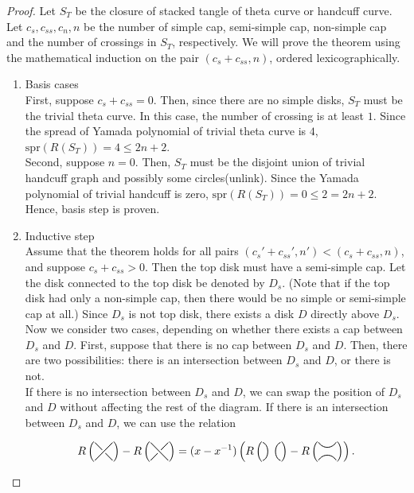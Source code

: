 \documentclass{article}
\newcommand{\czero}{
  \tikz[baseline=-0.6ex, scale=0.7]{
    \path (0,0) coordinate (base);
    \draw[line width=0.7pt] (0,0.4) .. controls (0.3,0.3) and (0.3,-0.3) .. (0,-0.4);
    \draw[line width=0.7pt] (0.8,0.4) .. controls (0.5,0.3) and (0.5,-0.3) .. (0.8,-0.4);
  }
}
\newcommand{\cinf}{
  \tikz[baseline=1.2ex, scale=0.7]{
    \path (0,0) coordinate (base);
    \draw[line width=0.7pt] (0.4, 0) .. controls (0.2, 0.3) and (-0.2, 0.3) .. (-0.4, 0);
    \draw[line width=0.7pt] (0.4, 0.8) .. controls (0.2, 0.5) and (-0.2, 0.5) .. (-0.4, 0.8);
  }
}
\newcommand{\Xslashfront}{
  \tikz[baseline=-0.6ex, scale=0.28]{
    \draw[line width=0.7pt] (-1,1) -- (1,-1);
    \draw[line width=4.0pt, white] (-0.5,-0.5) -- (0.5, 0.5);
    \draw[line width=0.7pt] (-1,-1) -- (1,1);
  }
}
\newcommand{\Xslashback}{
  \tikz[baseline=-0.6ex, scale=0.28]{
    \draw[line width=0.7pt] (-1,-1) -- (1,1);
    \draw[line width=4.0pt, white] (-0.5,0.5) -- (0.5,-0.5);
    \draw[line width=0.7pt] (-1,1) -- (1,-1);
  }
}
\theoremstyle{definition}
\theoremstyle{theorem}
\theoremstyle{proposition}
\theoremstyle{corollary}
\begin{document}
\begin{proof}
    Let $S_T$ be the closure of stacked tangle of theta curve or handcuff curve. Let $c_s, c_{ss}, c_n, n$ be the number of simple cap, semi-simple cap, non-simple cap and the number of crossings in $S_T$, respectively. We will prove the theorem using the mathematical induction on the pair $(c_s+c_{ss}, n)$, ordered lexicographically.
    \begin{enumerate}
        \item Basis cases \\
        First, suppose $c_s + c_{ss} = 0$. Then, since there are no simple disks, $S_T$ must be the trivial theta curve. In this case, the number of crossing is at least $1$. Since the spread of Yamada polynomial of trivial theta curve is $4$, $\mathrm{spr}(R(S_T)) = 4 \leq 2n+2$. \\
        Second, suppose $n = 0$. Then, $S_T$ must be the disjoint union of trivial handcuff graph and possibly some circles(unlink). Since the Yamada polynomial of trivial handcuff is zero, $\mathrm{spr}(R(S_T)) = 0 \leq 2 = 2n+2$. \\
        Hence, basis step is proven.
        
        \item Inductive step \\
        Assume that the theorem holds for all pairs $(c_s' + c_{ss}', n') < (c_s + c_{ss}, n)$, and suppose $c_s+c_{ss} > 0$. Then the top disk must have a semi-simple cap. Let the disk connected to the top disk be denoted by $D_s$. (Note that if the top disk had only a non-simple cap, then there would be no simple or semi-simple cap at all.) Since $D_s$ is not top disk, there exists a disk $D$ directly above $D_s$. Now we consider two cases, depending on whether there exists a cap between $D_s$ and $D$. First, suppose that there is no cap between $D_s$ and $D$. Then, there are two possibilities: there is an intersection between $D_s$ and $D$, or there is not. \\
        If there is no intersection between $D_s$ and $D$, we can swap the position of $D_s$ and $D$ without affecting the rest of the diagram. If there is an intersection between $D_s$ and $D$, we can use the relation

        \[ R \left( \Xslashfront \right) - R \left( \Xslashback \right) = (x - x^{-1}) \left( R \left( \czero \right) - R \left ( \cinf \right) \right). \]


\end{enumerate}
\end{proof}
\end{document}
